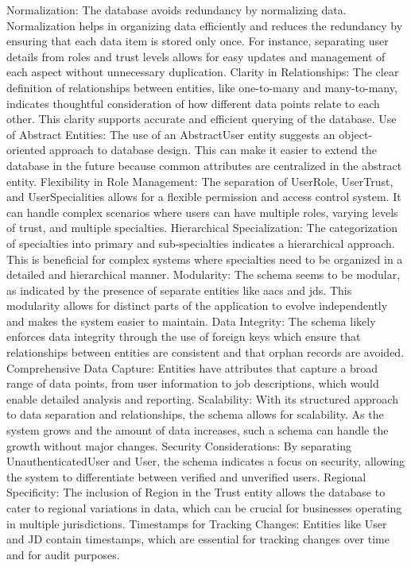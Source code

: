 Normalization: The database avoids redundancy by normalizing data. Normalization helps in organizing data efficiently and reduces the redundancy by ensuring that each data item is stored only once. For instance, separating user details from roles and trust levels allows for easy updates and management of each aspect without unnecessary duplication.
Clarity in Relationships: The clear definition of relationships between entities, like one-to-many and many-to-many, indicates thoughtful consideration of how different data points relate to each other. This clarity supports accurate and efficient querying of the database.
Use of Abstract Entities: The use of an AbstractUser entity suggests an object-oriented approach to database design. This can make it easier to extend the database in the future because common attributes are centralized in the abstract entity.
Flexibility in Role Management: The separation of UserRole, UserTrust, and UserSpecialities allows for a flexible permission and access control system. It can handle complex scenarios where users can have multiple roles, varying levels of trust, and multiple specialties.
Hierarchical Specialization: The categorization of specialties into primary and sub-specialties indicates a hierarchical approach. This is beneficial for complex systems where specialties need to be organized in a detailed and hierarchical manner.
Modularity: The schema seems to be modular, as indicated by the presence of separate entities like aacs and jds. This modularity allows for distinct parts of the application to evolve independently and makes the system easier to maintain.
Data Integrity: The schema likely enforces data integrity through the use of foreign keys which ensure that relationships between entities are consistent and that orphan records are avoided.
Comprehensive Data Capture: Entities have attributes that capture a broad range of data points, from user information to job descriptions, which would enable detailed analysis and reporting.
Scalability: With its structured approach to data separation and relationships, the schema allows for scalability. As the system grows and the amount of data increases, such a schema can handle the growth without major changes.
Security Considerations: By separating UnauthenticatedUser and User, the schema indicates a focus on security, allowing the system to differentiate between verified and unverified users.
Regional Specificity: The inclusion of Region in the Trust entity allows the database to cater to regional variations in data, which can be crucial for businesses operating in multiple jurisdictions.
Timestamps for Tracking Changes: Entities like User and JD contain timestamps, which are essential for tracking changes over time and for audit purposes.



